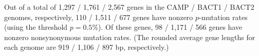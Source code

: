 Out of a total of 1,297 / 1,761 / 2,567 genes in the CAMP / BACT1 / BACT2 genomes, respectively, 110 / 1,511 / 677 genes have nonzero $p$-mutation rates (using the threshold $p=0.5\%$). Of these genes, 98 / 1,171 / 566 genes have nonzero nonsynonymous mutation rates. (The rounded average gene lengths for each genome are 919 / 1,106 / 897 bp, respectively.)\endinput